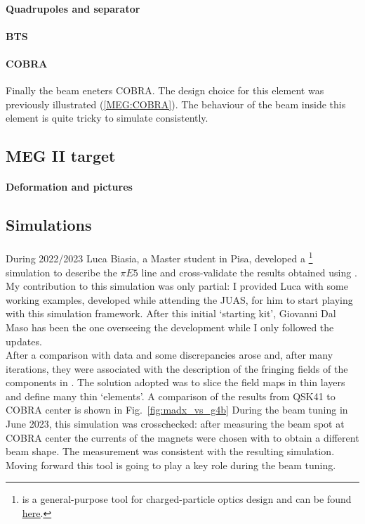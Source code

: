 \begin{refsection}
        \paragraph{Quadrupoles and separator}
        \paragraph{BTS}
        \paragraph{COBRA} Finally the beam eneters COBRA. 
        The design choice for this element was previously illustrated (\ref{MEG:COBRA}). 
        The behaviour of the beam inside this element is quite tricky to simulate consistently.
    \subsection{MEG II target}
        \paragraph{Deformation and pictures}
    \subsection{Simulations}
        \paragraph{\gfb}
        \paragraph{\madx} During 2022/2023 Luca Biasia, a Master student in Pisa, developed a \madx\footnote{\madx is a general-purpose tool for charged-particle optics design and can be found \href{http://madx.web.cern.ch/madx/}{\underline{here}}.} simulation to describe the $\pi E5$ line and cross-validate the results obtained using \gfb. 
        My contribution to this simulation was only partial: I provided Luca with some working \madx examples, developed while attending the JUAS, for him to start playing with this simulation framework. 
        After this initial `starting kit', Giovanni Dal Maso has been the one overseeing the development while I only followed the updates. \\
        After a comparison with data and \gfb some discrepancies arose and, after many iterations, they were associated with the description of the fringing fields of the components in \madx. 
        The solution adopted was to slice the field maps in thin layers and define many thin `\madx elements'. 
        A comparison of the results from QSK41 to COBRA center is shown in Fig.~\ref{fig:madx_vs_g4b}
        During the beam tuning in June 2023, this simulation was crosschecked: after measuring the beam spot at COBRA center the currents of the magnets were chosen with \madx to obtain a different beam shape. 
The measurement was consistent with the resulting simulation.
Moving forward this tool is going to play a key role during the beam tuning.


\end{refsection}
